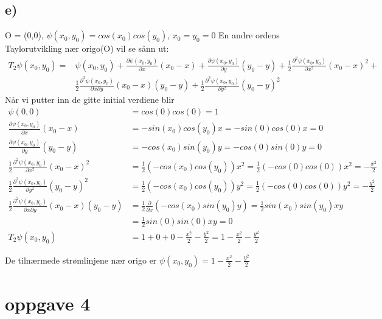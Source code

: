 \documentclass[a4paper,12pt,norsk]{article}
\begin{document}
\subsection{e)}
O = (0,0), $\psi(x_0,y_0) = cos(x_0)cos(y_0)$, $x_0=y_0=0$
En andre ordens Taylorutvikling nær origo(O) vil se sånn ut:
\begin{align*}
T_2\psi (x_0,y_0)= &\psi (x_0,y_0) + \frac{ \partial \psi (x_0,y_0) }{\partial{x}} (x_0 - x)+ \frac{ \partial \psi (x_0,y_0) }{\partial{y}}(y_0 - y) + \frac{1}{2}\frac{ \partial^2 \psi (x_0,y_0) }{\partial{x^2}} (x_0 - x)^2 +\\
&\frac{1}{2}\frac{ \partial^2 \psi (x_0,y_0) }{\partial{x}\partial{y}} (x_0 - x)(y_0 - y)+ \frac{1}{2}\frac{ \partial^2 \psi (x_0,y_0) }{\partial{y^2}} (y_0 - y)^2
\end{align*}
Når vi putter inn de gitte initial verdiene blir 
\begin{align*}
\psi(0,0) &= cos(0)cos(0) = 1\\
\frac{ \partial \psi (x_0,y_0) }{\partial{x}} (x_0 - x) &= -sin(x_0)cos(y_0)x = -sin(0)cos(0)x = 0\\
\frac{ \partial \psi (x_0,y_0) }{\partial{y}} (y_0 - y) &= -cos(x_0)sin(y_0)y = -cos(0)sin(0)y = 0\\
\frac{1}{2}\frac{ \partial^2 \psi (x_0,y_0) }{\partial{x^2}} (x_0 - x)^2 &= \frac{1}{2}(-cos(x_0)cos(y_0))x^2
= \frac{1}{2}(-cos(0)cos(0))x^2= -\frac{x^2}{2}\\
\frac{1}{2}\frac{ \partial^2 \psi (x_0,y_0) }{\partial{y^2}} (y_0 - y)^2 &= \frac{1}{2}(-cos(x_0)cos(y_0))y^2
= \frac{1}{2}(-cos(0)cos(0))y^2= -\frac{y^2}{2} \\
\frac{1}{2}\frac{ \partial^2 \psi (x_0,y_0) }{\partial{x}\partial{y}} (x_0 - x)(y_0 - y) &= \frac{1}{2} \frac{ \partial}{\partial{x}}(-cos(x_0)sin(y_0)y) = \frac{1}{2}sin(x_0)sin(y_0)xy \\ 
&= \frac{1}{2}sin(0)sin(0)xy = 0\\
T_2\psi (x_0,y_0) &= 1+ 0 + 0 -\frac{x^2}{2} -\frac{y^2}{2} = 1-\frac{x^2}{2} -\frac{y^2}{2} 
\end{align*}

De tilnærmede strømlinjene nær origo er $\psi (x_0,y_0) = 1- \frac{x^2}{2} - \frac{y^2}{2}$

\section{oppgave 4}
\end{document}
